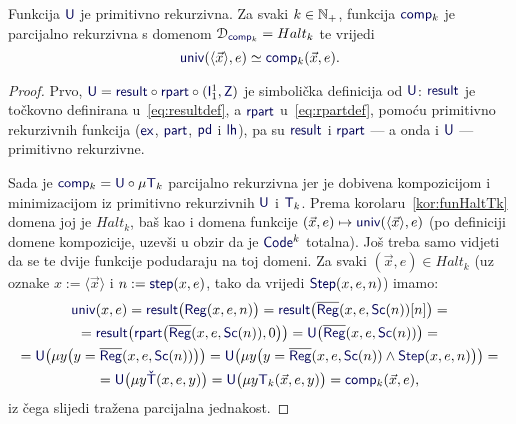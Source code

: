 \begin{propozicija}[{name=[parcijalna rekurzivnost univerzalnih funkcija dane mjesnosti]}]\label{prop:compspec}
Funkcija $\f U$ je primitivno rekurzivna. Za svaki $k\in{\mathbb N}_+$, funkcija $\f{comp}_k$ je parcijalno rekurzivna s domenom $\dom{\f{comp}_k}=Halt_k$ te vrijedi \begin{equation}\label{eq:comp=univ}
    \f{univ}(\langle\vec x\rangle,e)\simeq\f{comp}_k(\vec x,e)\text.
\end{equation}
\end{propozicija}
\begin{proof}
Prvo, $\f U=\f{result}\circ\f{rpart}\circ(\f I_1^1,\f Z)$ je simbolička definicija od $\f U$: $\f{result}$ je točkovno definirana u~\eqref{eq:resultdef}, a $\f{rpart}$ u~\eqref{eq:rpartdef}, pomoću primitivno rekurzivnih funkcija ($\f{ex}$, $\f{part}$, $\f{pd}$ i $\f{lh}$), pa su $\f{result}$ i $\f{rpart}$ --- a onda i $\f U$ --- primitivno rekurzivne.

Sada je $\f{comp}_k=\f U\circ\mu\f T_k$ parcijalno rekurzivna jer je dobivena kompozicijom i minimizacijom iz primitivno rekurzivnih $\f U$ i $\f T_k$. Prema korolaru~\ref{kor:funHaltTk} domena joj je $Halt_k$, baš kao i domena funkcije $(\vec x,e)\mapsto\f{univ}(\langle\vec x\rangle,e)$ (po definiciji domene kompozicije, uzevši u obzir da je $\f{Code}^k$ totalna). Još treba samo vidjeti da se te dvije funkcije podudaraju na toj domeni. Za svaki $(\vec x,e)\in Halt_k$ (uz oznake $x:=\langle\vec x\rangle$ i $n:=\f{step}(x,e)$, tako da vrijedi $\f{Step}(x,e,n)$) imamo:
\begin{multline}
    \f{univ}(x,e)=
    \f{result}\bigl(\f{Reg}(x,e,n)\bigr)=
    \f{result}\bigl(\overline{\f{Reg}}(x,e,\f{Sc}(n))[n]\bigr)=\\
    =
    \f{result}\bigl(\f{rpart}\bigl(\overline{\f{Reg}}(x,e,\f{Sc}(n)),0\bigr)\bigr)=
    \f U\bigl(\overline{\f{Reg}}(x,e,\f{Sc}(n))\bigr)
    =\\
    =\f U\bigl(\mu y\bigl(y=\overline{\f{Reg}}(x,e,\f{Sc}(n))\bigr)\bigr)=
    \f U\bigl(\mu y\bigl(y=\overline{\f{Reg}}(x,e,\f{Sc}(n))\land\f{Step}(x,e,n)\bigr)\bigr)=\\
    =\f U\bigl(\mu y\f{\check T}(x,e,y)\bigr)=
    \f U\bigl(\mu y\f T_k(\vec x,e,y)\bigr)=
    \f{comp}_k(\vec x,e)\text,
\end{multline}
iz čega slijedi tražena parcijalna jednakost.
\end{proof}

